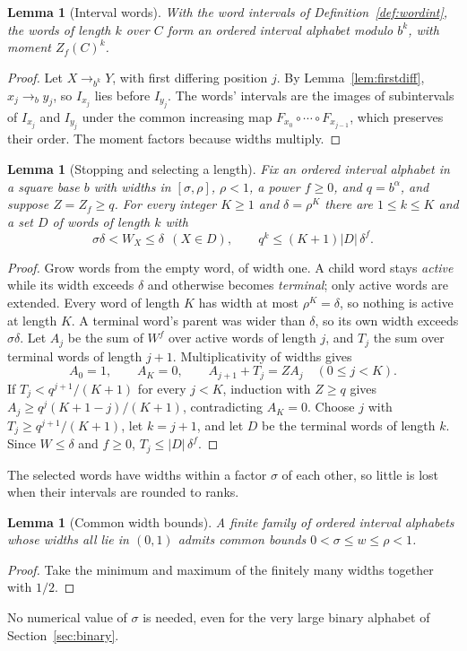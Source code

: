 \documentclass[11pt]{article}
\newtheorem{lemma}[theorem]{Lemma}
\theoremstyle{definition}
\theoremstyle{remark}
\newcommand{\card}[1]{\lvert #1\rvert}
\begin{document}
\begin{lemma}[Interval words]\label{lem:intwords}
With the word intervals of Definition~\ref{def:wordint}, the words of length
$k$ over $C$ form an ordered interval alphabet modulo $b^k$, with moment
$Z_f(C)^k$.
\end{lemma}
\begin{proof}
Let $X\to_{b^k}Y$, with first differing position $j$. By
Lemma~\ref{lem:firstdiff}, $x_j\to_by_j$, so $I_{x_j}$ lies before $I_{y_j}$.
The words' intervals are the images of subintervals of $I_{x_j}$ and
$I_{y_j}$ under the common increasing map $F_{x_0}\circ\cdots\circ F_{x_{j-1}}$,
which preserves their order. The moment factors because widths multiply.
\end{proof}

\begin{lemma}[Stopping and selecting a length]\label{lem:stopping}
Fix an ordered interval alphabet in a square base $b$ with widths in
$[\sigma,\rho]$, $\rho<1$, a power $f\ge0$, and $q=b^\alpha$, and suppose
$Z=Z_f\ge q$. For every integer $K\ge1$ and $\delta=\rho^K$ there are
$1\le k\le K$ and a set $D$ of words of length $k$ with
\[
 \sigma\delta<W_X\le\delta\ \ (X\in D),\qquad
 q^k\le(K+1)\card D\,\delta^f .
\]
\end{lemma}
\begin{proof}
Grow words from the empty word, of width one. A child word stays
\emph{active} while its width exceeds $\delta$ and otherwise becomes
\emph{terminal}; only active words are extended. Every word of length $K$ has
width at most $\rho^K=\delta$, so nothing is active at length $K$. A terminal
word's parent was wider than $\delta$, so its own width exceeds $\sigma\delta$.
Let $A_j$ be the sum of $W^f$ over active words of length $j$, and $T_j$ the
sum over terminal words of length $j+1$. Multiplicativity of widths gives
\[
 A_0=1,\qquad A_K=0,\qquad A_{j+1}+T_j=ZA_j\quad(0\le j<K).
\]
If $T_j<q^{j+1}/(K+1)$ for every $j<K$, induction with $Z\ge q$ gives
$A_j\ge q^j(K+1-j)/(K+1)$, contradicting $A_K=0$. Choose $j$ with
$T_j\ge q^{j+1}/(K+1)$, let $k=j+1$, and let $D$ be the terminal words of
length $k$. Since $W\le\delta$ and $f\ge0$, $T_j\le\card D\,\delta^f$.
\end{proof}
The selected words have widths within a factor $\sigma$ of each other, so
little is lost when their intervals are rounded to ranks.

\begin{lemma}[Common width bounds]\label{lem:finitewidth}
A finite family of ordered interval alphabets whose widths all lie in $(0,1)$
admits common bounds $0<\sigma\le w\le\rho<1$.
\end{lemma}
\begin{proof}
Take the minimum and maximum of the finitely many widths together with $1/2$.
\end{proof}
No numerical value of $\sigma$ is needed, even for the very large binary
alphabet of Section~\ref{sec:binary}.
\end{document}
